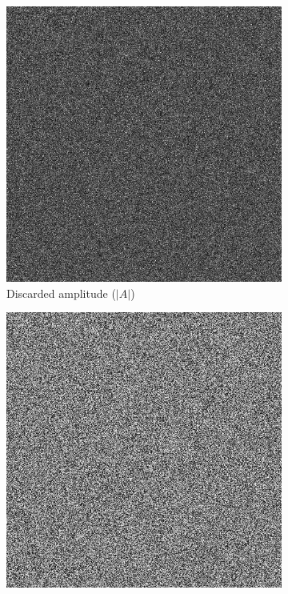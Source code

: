\begin{figure}[H]
  \centering
  \begin{subfigure}[t]{0.3\textwidth}
    \centering
    \includegraphics[width=\textwidth]{Naive_rand_discarded_amplitude.png}
    \caption{Discarded amplitude ($\vert A\vert$)}
    \label{fig:Naive_rand_discarded_amplitude}
  \end{subfigure}
  \hfill
  \begin{subfigure}[t]{0.3\textwidth}
    \centering
    \includegraphics[width=\textwidth]{Naive_rand_holo.png}

\end{subfigure}
\end{figure}
